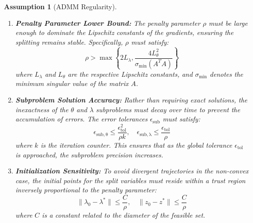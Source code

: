 \documentclass[preprint,12pt,authoryear]{elsarticle}
\newtheorem{assumption}{Assumption}
\begin{document}
\begin{assumption}[ADMM Regularity]
\begin{enumerate}
    \item \textbf{Penalty Parameter Lower Bound:} The penalty parameter $\rho$ must be large enough to dominate the Lipschitz constants of the gradients, ensuring the splitting remains stable. Specifically, $\rho$ must satisfy:
    \begin{equation}
        \rho > \max\left\{2L_\lambda, \frac{4L_\theta^2}{\sigma_{\min}(A^TA)}\right\}
    \end{equation}
    where $L_\lambda$ and $L_\theta$ are the respective Lipschitz constants, and $\sigma_{\min}$ denotes the minimum singular value of the matrix $A$.

    \item \textbf{Subproblem Solution Accuracy:} Rather than requiring exact solutions, the inexactness of the $\theta$ and $\lambda$ subproblems must decay over time to prevent the accumulation of errors. The error tolerances $\epsilon_{\mathrm{sub}}$ must satisfy:
    \begin{equation}
        \epsilon_{\mathrm{sub,\theta}} \leq \frac{\epsilon_{\mathrm{tol}}^2}{\rho k}, \quad \epsilon_{\mathrm{sub,\lambda}} \leq \frac{\epsilon_{\mathrm{tol}}}{\rho}
    \end{equation}
    where $k$ is the iteration counter. This ensures that as the global tolerance $\epsilon_{\mathrm{tol}}$ is approached, the subproblem precision increases.

    \item \textbf{Initialization Sensitivity:} To avoid divergent trajectories in the non-convex case, the initial points for the split variables must reside within a trust region inversely proportional to the penalty parameter:
    \begin{equation}
        \|\lambda_0 - \lambda^*\| \leq \frac{C}{\rho}, \quad \|z_0 - z^*\| \leq \frac{C}{\rho}
    \end{equation}
    where $C$ is a constant related to the diameter of the feasible set.
\end{enumerate}
\end{assumption}
\end{document}
